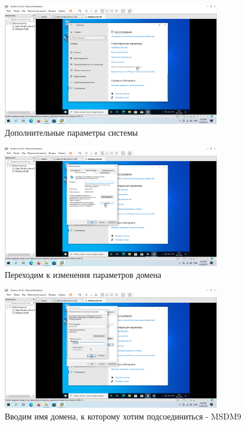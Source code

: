 \documentclass[a4paper]{article}
\begin{document}
  \begin{figure}[H]
    \centering
    \includegraphics[width=0.85\textwidth]{Screenshot_101}
    \caption{Дополнительные параметры системы}
    \label{img:101}
  \end{figure}

  \begin{figure}[H]
    \centering
    \includegraphics[width=0.85\textwidth]{Screenshot_102}
    \caption{Переходим к изменения параметров домена}
    \label{img:102}
  \end{figure}

  \begin{figure}[H]
    \centering
    \includegraphics[width=0.85\textwidth]{Screenshot_104}
    \caption{Вводим имя домена, к которому хотим подсоединиться - MSDM9}
    \label{img:104}
  \end{figure}
\end{document}
